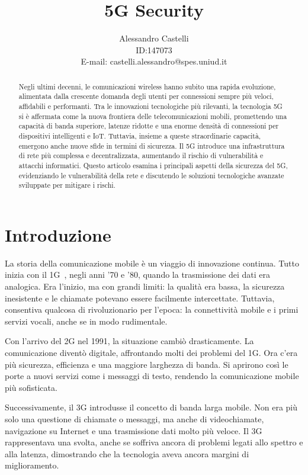 \documentclass[english]{article}
\title{5G Security}
\author{Alessandro Castelli \\ ID:\@147073 \\ E-mail: castelli.alessandro@spes.uniud.it}
\begin{document}
\begin{abstract}
	Negli ultimi decenni, le comunicazioni wireless hanno subito una rapida
	evoluzione, alimentata dalla crescente domanda degli utenti per connessioni
	sempre più veloci, affidabili e performanti. Tra le innovazioni tecnologiche
	più rilevanti, la tecnologia 5G si è affermata come la nuova frontiera delle
	telecomunicazioni mobili, promettendo una capacità di banda superiore,
	latenze ridotte e una enorme densità di connessioni per dispositivi
	intelligenti e IoT. Tuttavia, insieme a queste straordinarie capacità,
	emergono anche nuove sfide in termini di sicurezza. Il 5G introduce una
	infrastruttura di rete più complessa e decentralizzata, aumentando il rischio
	di vulnerabilità e attacchi informatici. Questo articolo esamina i principali
	aspetti della sicurezza del 5G, evidenziando le vulnerabilità della rete e
	discutendo le soluzioni tecnologiche avanzate sviluppate per mitigare i rischi.
\end{abstract}

\clearpage

\tableofcontents
\newpage
\section{Introduzione}

La storia della comunicazione mobile è un viaggio di innovazione continua.
Tutto inizia con il 1G~\cite{dangi2021study}, negli anni '70 e '80, quando la
trasmissione dei dati era analogica. Era l'inizio, ma con grandi limiti: la
qualità era bassa, la sicurezza inesistente e le chiamate potevano essere
facilmente intercettate. Tuttavia, consentiva qualcosa di rivoluzionario per
l'epoca: la connettività mobile e i primi servizi vocali, anche se in modo
rudimentale.

Con l'arrivo del 2G nel 1991, la situazione cambiò drasticamente. La
comunicazione diventò digitale, affrontando molti dei problemi del 1G. Ora
c'era più sicurezza, efficienza e una maggiore larghezza di banda. Si aprirono
così le porte a nuovi servizi come i messaggi di testo, rendendo la
comunicazione mobile più sofisticata.

Successivamente, il 3G introdusse il concetto di banda larga mobile. Non era
più solo una questione di chiamate o messaggi, ma anche di videochiamate,
navigazione su Internet e una trasmissione dati molto più veloce. Il 3G
rappresentava una svolta, anche se soffriva ancora di problemi legati allo
spettro e alla latenza, dimostrando che la tecnologia aveva ancora margini di
miglioramento.
\end{document}
